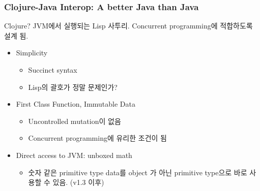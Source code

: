 \begin{frame}
\frametitle{Clojure-Java Interop: A better Java than Java}

Clojure? JVM에서 실행되는 Lisp 사투리. Concurrent programming에 적합하도록 설계 됨.

\begin{itemize}
\item Simplicity
  \begin{itemize}
  \item Succinct syntax
  \item Lisp의 괄호가 정말 문제인가?
  \end{itemize}

\item First Class Function, Immutable Data 
  \begin{itemize}
  \item Uncontrolled mutation이 없음
  \item Concurrent programming에 유리한 조건이 됨
  \end{itemize}

\item Direct access to JVM: unboxed math
  \begin{itemize}
  \item 숫자 같은 primitive type data를 object 가 아닌 primitive
    type으로 바로 사용할 수 있음. (v1.3 이후)
  \end{itemize}

\end{itemize}


\end{frame}
